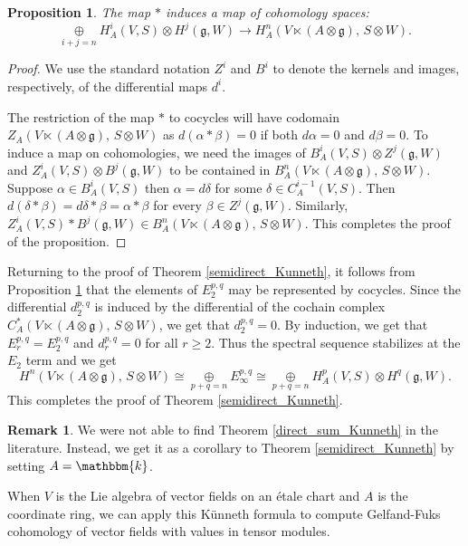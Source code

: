 \documentclass[12pt]{amsart}
\newcommand{\g}{{\mathfrak{g}}}
\renewcommand{\k}{{\mathbbm{k}}}
\newtheorem{proposition}[theorem]{Proposition}
\theoremstyle{definition}
\newtheorem{remark}[definition]{Remark}
\begin{document}
\begin{proposition}
\label{cohomology_map}
The map $\ast$ induces a map of cohomology spaces:
\[
\mathop\oplus\limits_{i+j=n} H_A^i(V, S) \otimes H^{j}(\g, W) \rightarrow H_A^{n}(V \ltimes (A \otimes \g),\, S \otimes W).
\]
\end{proposition}
\begin{proof}
We use the standard notation $Z^i$ and $B^i$ to denote the kernels and images, respectively, of the differential maps $d^i$. 

The restriction of the map $\ast$ to cocycles will have codomain $Z_A(V\ltimes (A \otimes \g),\, S \otimes W)$ as $d(\alpha \ast \beta) =0$ if both $d\alpha =0$ and $d\beta =0$. To induce a map on cohomologies, we need the images of $B_A^i(V, S) \otimes Z^{j}(\g,W)$ and $Z_A^i(V,S) \otimes B^{j}(\g,W)$ to be contained in $B_A^n(V \ltimes (A \otimes \g),\, S \otimes W)$. Suppose $\alpha \in B_A^i(V,S)$ then $\alpha = d\delta$ for some $\delta \in C_A^{i-1}(V, S)$. Then $d(\delta \ast \beta) = d\delta \ast \beta= \alpha \ast \beta$ for every $\beta \in Z^{j}(\g, W)$. Similarly, $Z_A^i(V, S) \ast B^{j}(\g,W) \in B^n_A(V \ltimes(A \otimes \g),\, S \otimes W)$.  This completes the proof of the proposition.
\end{proof}

Returning to the proof of Theorem \ref{semidirect_Kunneth}, it follows from 
Proposition \ref{cohomology_map} that the elements of $E_2^{p,q}$ may be represented by cocycles. Since the differential $d_2^{p,q}$ is induced by the differential of the cochain complex $C^*_A (V \ltimes (A \otimes \g),\, S \otimes W)$, we get that
$d_2^{p,q} = 0$. By induction, we get that $E_r^{p,q} = E_2^{p,q}$ and 
$d_r^{p,q} = 0$ for all $r \geq 2$. Thus the spectral sequence stabilizes at the $E_2$ term and we get
\[
H^n (V \ltimes (A \otimes \g),\, S \otimes W) \cong \mathop\oplus\limits_{p+q = n} E^{p,q}_\infty \cong \mathop\oplus\limits_{p+q = n} H_A^p(V, S) \otimes H^q(\g, W).
\]
This completes the proof of Theorem \ref{semidirect_Kunneth}.

\begin{remark}
We were not able to find Theorem \ref{direct_sum_Kunneth} in the literature.
Instead, we get it as a corollary to Theorem \ref{semidirect_Kunneth} by setting $A = \k$.
\end{remark}

When $V$ is the Lie algebra of vector fields on an \'etale chart and $A$ is the coordinate ring, we can apply this K\"unneth formula to compute Gelfand-Fuks cohomology of vector fields with values in tensor modules. 
\end{document}
